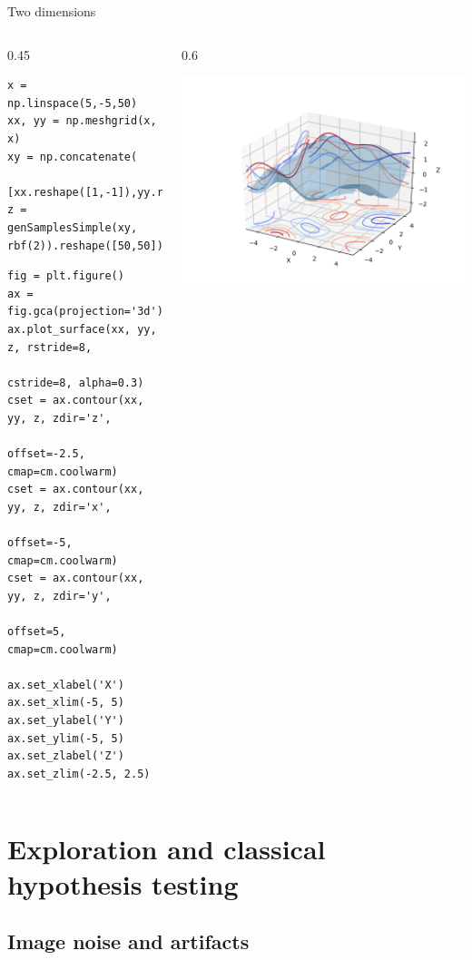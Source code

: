 \documentclass[presentation]{beamer}
\begin{document}
\begin{frame}[fragile,label={sec:org531b380}]{Two dimensions}
 \begin{columns}
\begin{column}{0.45\columnwidth}
\begin{verbatim}
x = np.linspace(5,-5,50)
xx, yy = np.meshgrid(x, x)
xy = np.concatenate(
       [xx.reshape([1,-1]),yy.reshape([1,-1])]).T
z = genSamplesSimple(xy, rbf(2)).reshape([50,50])
\end{verbatim}

\begin{verbatim}
fig = plt.figure()
ax = fig.gca(projection='3d')
ax.plot_surface(xx, yy, z, rstride=8, 
                cstride=8, alpha=0.3)
cset = ax.contour(xx, yy, z, zdir='z',
                  offset=-2.5, cmap=cm.coolwarm)
cset = ax.contour(xx, yy, z, zdir='x', 
                  offset=-5, cmap=cm.coolwarm)
cset = ax.contour(xx, yy, z, zdir='y', 
                  offset=5, cmap=cm.coolwarm)

ax.set_xlabel('X')
ax.set_xlim(-5, 5)
ax.set_ylabel('Y')
ax.set_ylim(-5, 5)
ax.set_zlabel('Z')
ax.set_zlim(-2.5, 2.5)
\end{verbatim}
\end{column}

\begin{column}{0.6\columnwidth}
\begin{center}
\includegraphics[width=.9\linewidth]{images/fig03.png}
\end{center}
\end{column}
\end{columns}
\end{frame}



\section{Exploration and classical hypothesis testing}
\label{sec:org868e051}
\subsection{Image noise and artifacts}
\label{sec:org5c6e92d}
\end{document}
